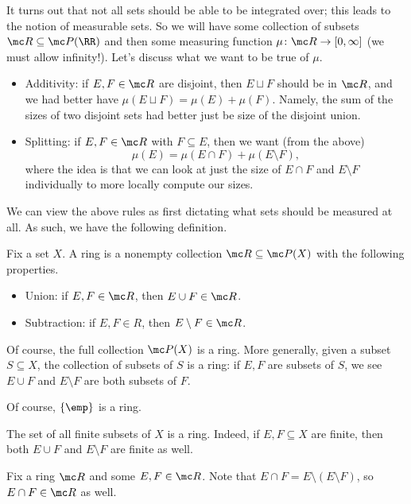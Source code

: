 \documentclass[../notes.tex]{subfiles}
\begin{document}
It turns out that not all sets should be able to be integrated over; this leads to the notion of measurable sets. So we will have some collection of subsets $\mc R\subseteq\mc P(\RR)$ and then some measuring function $\mu\colon\mc R\to[0,\infty]$ (we must allow infinity!). Let's discuss what we want to be true of $\mu$.
\begin{itemize}
	\item Additivity: if $E,F\in\mc R$ are disjoint, then $E\sqcup F$ should be in $\mc R$, and we had better have $\mu(E\sqcup F)=\mu(E)+\mu(F)$. Namely, the sum of the sizes of two disjoint sets had better just be size of the disjoint union.
	\item Splitting: if $E,F\in\mc R$ with $F\subseteq E$, then we want (from the above)
	\[\mu(E)=\mu(E\cap F)+\mu(E\setminus F),\]
	where the idea is that we can look at just the size of $E\cap F$ and $E\setminus F$ individually to more locally compute our sizes.
\end{itemize}
We can view the above rules as first dictating what sets should be measured at all. As such, we have the following definition.
\begin{definition}[Ring]
	Fix a set $X$. A ring is a nonempty collection $\mc R\subseteq\mc P(X)$ with the following properties.
	\begin{itemize}
		\item Union: if $E,F\in\mc R$, then $E\cup F\in\mc R$.
		\item Subtraction: if $E,F\in R$, then $E\setminus F\in\mc R$.
	\end{itemize}
\end{definition}
\begin{example}
	Of course, the full collection $\mc P(X)$ is a ring. More generally, given a subset $S\subseteq X$, the collection of subsets of $S$ is a ring: if $E,F$ are subsets of $S$, we see $E\cup F$ and $E\setminus F$ are both subsets of $F$.
\end{example}
\begin{example}
	Of course, $\{\emp\}$ is a ring.
\end{example}
\begin{example}
	The set of all finite subsets of $X$ is a ring. Indeed, if $E,F\subseteq X$ are finite, then both $E\cup F$ and $E\setminus F$ are finite as well.
\end{example}
\begin{remark} \label{rem:ring-has-intersections}
	Fix a ring $\mc R$ and some $E,F\in\mc R$. Note that $E\cap F=E\setminus(E\setminus F)$, so $E\cap F\in\mc R$ as well.
\end{remark}
\end{document}
